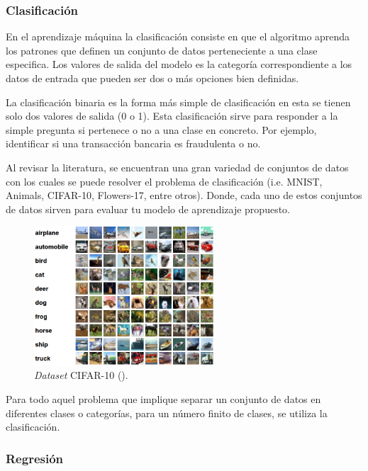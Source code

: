\subsubsection{Clasificación}

En el aprendizaje máquina la clasificación consiste en que el algoritmo aprenda los patrones que definen un conjunto de datos perteneciente a una clase especifica. Los valores de salida del modelo es la categoría correspondiente a los datos de entrada que pueden ser dos o más opciones bien definidas.

La clasificación binaria es la forma más simple de clasificación en esta se tienen solo dos valores de salida (0 o 1). Esta clasificación sirve para responder a la simple pregunta si pertenece o no a una clase en concreto. Por ejemplo, identificar si una transacción bancaria es fraudulenta o no.

Al revisar la literatura, se encuentran una gran variedad de conjuntos de datos con los cuales se puede resolver el problema de clasificación (i.e. MNIST, Animals, CIFAR-10, Flowers-17, entre otros). Donde, cada uno de estos conjuntos de datos sirven para evaluar tu modelo de aprendizaje propuesto.

\begin{figure}[H]
    \centering
    \includegraphics[width=0.6\textwidth]{MarcoTeorico/imgs/CIFAR-10.png}
    \caption{\textit{Dataset} CIFAR-10 (\cite{cifar10}).}
    \label{fig:cifar10}
\end{figure}

Para todo aquel problema que implique separar un conjunto de datos en diferentes clases o categorías, para un número finito de clases, se utiliza la clasificación.

\subsubsection{Regresión}

